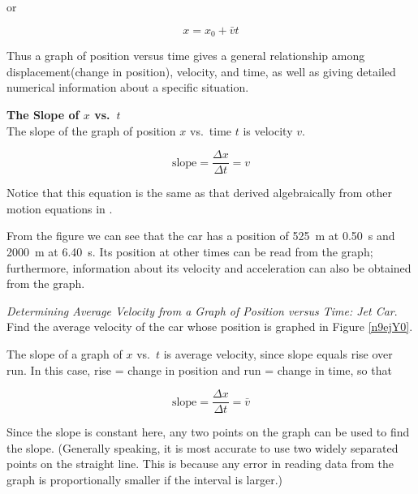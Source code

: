 \documentclass[dvipsnames]{article}
\begin{document}
or

\begin{equation}
    x = x_0 + \bar{v} t
\end{equation}

Thus a graph of position versus time gives a general relationship among displacement(change in position), velocity, and time, as well as giving detailed numerical information about a specific situation.

\vspace{1em}

\begin{mdframed}[backgroundcolor=black!10]
\textbf{The Slope of $x$ vs.~$t$}\\
The slope of the graph of position $x$ vs.~time $t$ is velocity $v$.

\begin{equation}
    \text{slope} = \frac{\Delta x}{\Delta t} = v
\end{equation}

Notice that this equation is the same as that derived algebraically from other motion equations in . 
\end{mdframed}

From the figure we can see that the car has a position of \SI{525}{m} at \SI{0.50}{s} and \SI{2000}{m} at \SI{6.40}{s}. Its position at other times can be read from the graph; furthermore, information about its velocity and acceleration can also be obtained from the graph.

\begin{example}
    \textit{Determining Average Velocity from a Graph of Position versus Time: Jet Car}. Find the average velocity of the car whose position is graphed in Figure \ref{n9ejY0}.
\end{example}

\Solution The slope of a graph of $x$ vs.~$t$ is average velocity, since slope equals rise over run. In this case, rise = change in position and run = change in time, so that

\begin{equation*}
    \text{slope} = \frac{\Delta x}{\Delta t} = \bar{v}
\end{equation*}

Since the slope is constant here, any two points on the graph can be used to find the slope. (Generally speaking, it is most accurate to use two widely separated points on the straight line. This is because any error in reading data from the graph is proportionally smaller if the interval is larger.)
\end{document}
